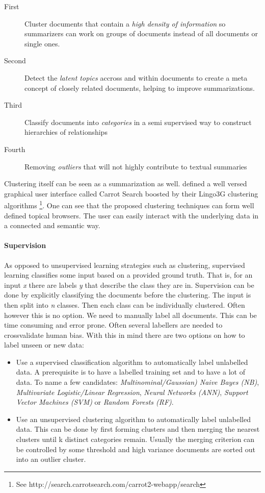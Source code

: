   \begin{description}
    \item[First] Cluster documents that contain a \emph{high density of information} so summarizers can work on groups of documents instead of all documents or single ones.
    \item[Second] Detect the \emph{latent topics} accross and within documents to create a meta concept of closely related documents, helping to improve summarizations.
    \item[Third] Classify documents into \emph{categories} in a semi supervised way to construct hierarchies of relationships
    \item[Fourth] Removing \emph{outliers} that will not highly contribute to textual summaries
  \end{description}

  Clustering itself can be seen as a summarization as well. \cite{Carrot2Search2003} defined a well versed graphical user interface called Carrot Search boosted by their Lingo3G clustering algorithms \footnote{See http://search.carrotsearch.com/carrot2-webapp/search}. One can see that the proposed clustering techniques can form well defined topical browsers. The user can easily interact with the underlying data in a connected and semantic way.

  \paragraph{Supervision}
    As opposed to unsupervised learning strategies such as clustering, supervised learning classifies some input based on a provided ground truth. That is, for an input \emph{x} there are labels \emph{y} that describe the class they are in. Supervision can be done by explicitly classifying the documents before the clustering. The input is then split into \emph{n} classes. Then each class can be individually clustered. Often however this is no option. We need to manually label all documents. This can be time consuming and error prone. Often several labellers are needed to crossvalidate human bias.
    With this in mind there are two options on how to label unseen or new data:

      \begin{itemize}
        \item Use a supervised classification algorithm to automatically label unlabelled data. A prerequisite is to have a labelled training set and to have a lot of data. To name a few candidates: \emph{Multinominal/Gaussian) Naive Bayes (NB)}, \emph{Multivariate Logistic/Linear Regression}, \emph{Neural Networks (ANN)}, \emph{Support Vector Machines (SVM)} or \emph{Random Forests (RF)}. \cite{BishopML}
        \item Use an unsupervised clustering algorithm to automatically label unlabelled data. This can be done by first forming clusters and then merging the nearest clusters until k distinct categories remain. Usually the merging criterion can be controlled by some threshold and high variance documents are sorted out into an outlier cluster.
      \end{itemize}

